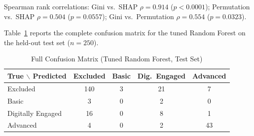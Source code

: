 \documentclass[conference]{IEEEtran}
\begin{document}
\begin{table}[h]
\caption{Full Feature Importance Comparison}
\label{tab:full_importance}
\centering
{}
\end{table}
 
Spearman rank correlations: Gini vs.\ SHAP $\rho = 0.914$ ($p < 0.0001$); Permutation vs.\ SHAP $\rho = 0.504$ ($p = 0.0557$); Gini vs.\ Permutation $\rho = 0.554$ ($p = 0.0323$).
 
Table~\ref{tab:full_confusion} reports the complete confusion matrix for the tuned Random Forest on the held-out test set ($n=250$).
 
\begin{table}[h]
\caption{Full Confusion Matrix (Tuned Random Forest, Test Set)}
\label{tab:full_confusion}
\centering
\begin{tabular}{@{}lcccc@{}}
\toprule
True $\backslash$ Predicted & Excluded & Basic & Dig.\ Engaged & Advanced \\
\midrule
Excluded & 140 & 3 & 21 & 7 \\
Basic & 3 & 0 & 2 & 0 \\
Digitally Engaged & 16 & 0 & 8 & 1 \\
Advanced & 4 & 0 & 2 & 43 \\
\bottomrule
\end{tabular}
\end{table}
 
\end{document}
